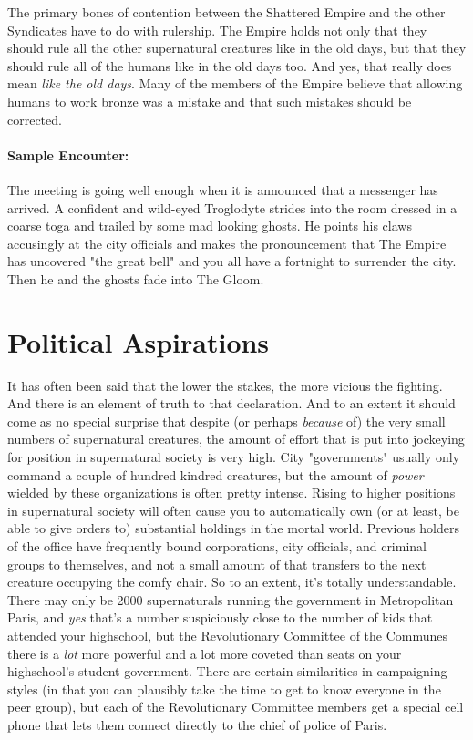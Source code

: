 The primary bones of contention between the Shattered Empire and the other Syndicates have to do with rulership. The Empire holds not only that they should rule all the other supernatural creatures like in the old days, but that they should rule all of the humans like in the old days too. And yes, that really does mean \textit{like the old days}. Many of the members of the Empire believe that allowing humans to work bronze was a mistake and that such mistakes should be corrected.

\paragraph{Sample Encounter:} The meeting is going well enough when it is announced that a messenger has arrived. A confident and wild-eyed Troglodyte strides into the room dressed in a coarse toga and trailed by some mad looking ghosts. He points his claws accusingly at the city officials and makes the pronouncement that The Empire has uncovered "the great bell" and you all have a fortnight to surrender the city. Then he and the ghosts fade into The Gloom.

\section{Political Aspirations}

It has often been said that the lower the stakes, the more vicious the fighting. And there is an element of truth to that declaration. And to an extent it should come as no special surprise that despite (or perhaps \textit{because} of)  the very small numbers of supernatural creatures, the amount of effort that is put into jockeying for position in supernatural society is very high. City "governments" usually only command a couple of hundred kindred creatures, but the amount of \textit{power} wielded by these organizations is often pretty intense. Rising to higher positions in supernatural society will often cause you to automatically own (or at least, be able to give orders to) substantial holdings in the mortal world. Previous holders of the office have frequently bound corporations, city officials, and criminal groups to themselves, and not a small amount of that transfers to the next creature occupying the comfy chair. So to an extent, it's totally understandable. There may only be 2000 supernaturals running the government in Metropolitan Paris, and \textit{yes} that's a number suspiciously close to the number of kids that attended your highschool, but the Revolutionary Committee of the Communes there is a \textit{lot} more powerful and a lot more coveted than seats on your highschool's student government. There are certain similarities in campaigning styles (in that you can plausibly take the time to get to know everyone in the peer group), but each of the Revolutionary Committee members get a special cell phone that lets them connect directly to the chief of police of Paris.

